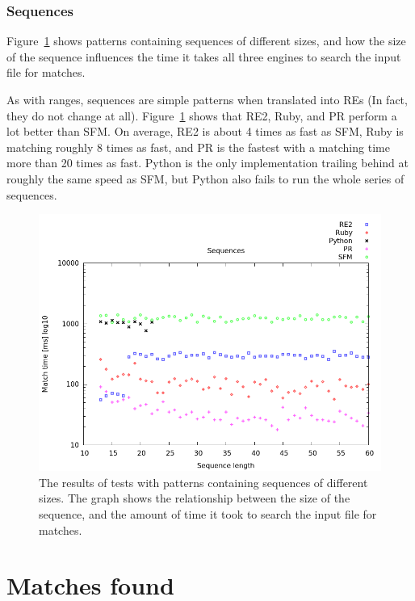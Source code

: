 \documentclass[12pt]{article}
\theoremstyle{definition}
\begin{document}
\subsubsection{Sequences}

Figure~\ref{graph:cases:sequences} shows patterns containing sequences of different sizes, and how the size of the sequence influences the time it takes all three engines to search the input file for matches.

As with ranges, sequences are simple patterns when translated into REs (In fact, they do not change at all). Figure~\ref{graph:cases:sequences} shows that RE2, Ruby, and PR perform a lot better than SFM. On average, RE2 is about 4 times as fast as SFM, Ruby is matching roughly 8 times as fast, and PR is the fastest with a matching time more than 20 times as fast.
Python is the only implementation trailing behind at roughly the same speed as SFM, but Python also fails to run the whole series of sequences.

\begin{figure}[H]
	\begin{center}
		\includegraphics[scale=0.55]{graphs/sequences.png}	
	\end{center}
	\caption{The results of tests with patterns containing sequences of different sizes. The graph shows the relationship between the size of the sequence, and the amount of time it took to search the input file for matches.}
	\label{graph:cases:sequences}
\end{figure}

\section{Matches found}
\end{document}

